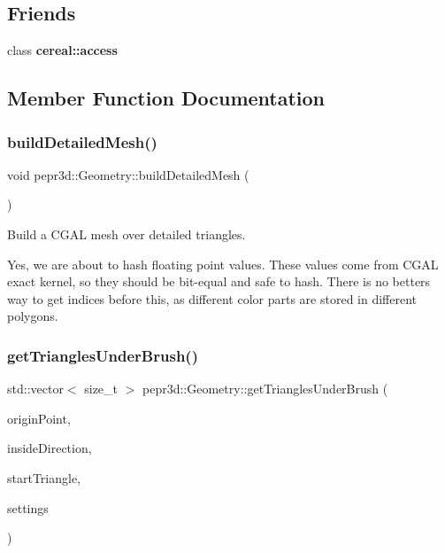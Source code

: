 \subsection*{Friends}
\begin{DoxyCompactItemize}
\item 
\mbox{\label{classpepr3d_1_1_geometry_ab2f44cbb59a08132f4c843e5225bba0e}} 
class {\bfseries cereal\+::access}
\end{DoxyCompactItemize}


\subsection{Member Function Documentation}
\mbox{\label{classpepr3d_1_1_geometry_a5f0594ebe7f3a779dc9cf18f943f1c56}} 
\subsubsection{\texorpdfstring{buildDetailedMesh()}{buildDetailedMesh()}}
{\footnotesize\ttfamily void pepr3d\+::\+Geometry\+::build\+Detailed\+Mesh (\begin{DoxyParamCaption}{ }\end{DoxyParamCaption})\hspace{0.3cm}{\ttfamily [private]}}



Build a C\+G\+AL mesh over detailed triangles. 

Yes, we are about to hash floating point values. These values come from C\+G\+AL exact kernel, so they should be bit-\/equal and safe to hash. There is no betters way to get indices before this, as different color parts are stored in different polygons.\mbox{\label{classpepr3d_1_1_geometry_a1d420e96bc8c92c620b5473677173d81}} 
\subsubsection{\texorpdfstring{getTrianglesUnderBrush()}{getTrianglesUnderBrush()}}
{\footnotesize\ttfamily std\+::vector$<$ size\+\_\+t $>$ pepr3d\+::\+Geometry\+::get\+Triangles\+Under\+Brush (\begin{DoxyParamCaption}\item[{const glm\+::vec3 \&}]{origin\+Point,  }\item[{const glm\+::vec3 \&}]{inside\+Direction,  }\item[{size\+\_\+t}]{start\+Triangle,  }\item[{const struct \mbox{\hyperlink{structpepr3d_1_1_brush_settings}{Brush\+Settings}} \&}]{settings }\end{DoxyParamCaption})}



